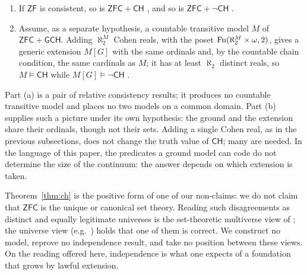 \begin{theorem}\label{thm:ch}
\begin{enumerate}[label=\textup{(\alph*)}]
\item If $\mathsf{ZF}$ is consistent, so is $\mathsf{ZFC}+\mathsf{CH}$
\citep{Godel1938,Godel1940}, and so is $\mathsf{ZFC}+\neg\mathsf{CH}$ \citep{Cohen1963}.
\item Assume, as a separate hypothesis, a countable transitive model $M$ of
$\mathsf{ZFC}+\mathsf{GCH}$. Adding $\aleph_2^M$ Cohen reals, with the poset
$\operatorname{Fn}(\aleph_2^M\times\omega,2)$, gives a generic extension $M[G]$ with the same ordinals and,
by the countable chain condition, the same cardinals as $M$; it has at least $\aleph_2$ distinct
reals, so $M\models\mathsf{CH}$ while $M[G]\models\neg\mathsf{CH}$
\citep{Kunen2011}.
\end{enumerate}
\end{theorem}

Part (a) is a pair of relative consistency results; it produces no countable transitive model and
places no two models on a common domain. Part (b) supplies such a picture under its own
hypothesis: the ground and the extension share their ordinals, though not their sets. Adding a
single Cohen real, as in the previous subsections, does not change the truth value of
$\mathsf{CH}$; many are needed. In the language of this paper, the predicates a ground model can
code do not determine the size of the continuum: the answer depends on which extension is taken.

\begin{remark}\label{rem:notunique}
Theorem~\ref{thm:ch} is the positive form of one of our non-claims: we do not claim that
$\mathsf{ZFC}$ is the unique or canonical set theory. Reading such disagreements as distinct and
equally legitimate universes is the set-theoretic multiverse view of \citet{Hamkins2012}; the
universe view (e.g.\ \citealp{Godel1947}) holds that one of them is correct. We construct no
model, reprove no independence result, and take no position between these views. On the reading
offered here, independence is what one expects of a foundation that grows by lawful extension.
\end{remark}
